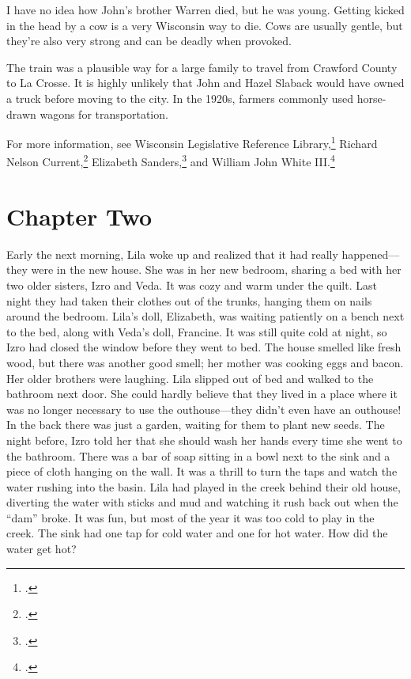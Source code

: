 \documentclass[
  american,
  letterpaper,
]{book}
\begin{document}
I have no idea how John's brother Warren died, but he was young. Getting
kicked in the head by a cow is a very Wisconsin way to die. Cows are
usually gentle, but they're also very strong and can be deadly when
provoked.

The train was a plausible way for a large family to travel from Crawford
County to La Crosse. It is highly unlikely that John and Hazel Slaback
would have owned a truck before moving to the city. In the 1920s,
farmers commonly used horse-drawn wagons for transportation.

For more information, see Wisconsin Legislative Reference
Library,\footnote{.}
Richard Nelson Current,\footnote{.} Elizabeth Sanders,\footnote{.} and William John White
III.\footnote{.}


\chapter{Chapter Two}\label{chapter-two}

Early the next morning, Lila woke up and realized that it had really
happened---they were in the new house. She was in her new bedroom,
sharing a bed with her two older sisters, Izro and Veda. It was cozy and
warm under the quilt. Last night they had taken their clothes out of the
trunks, hanging them on nails around the bedroom. Lila's doll,
Elizabeth, was waiting patiently on a bench next to the bed, along with
Veda's doll, Francine. It was still quite cold at night, so Izro had
closed the window before they went to bed. The house smelled like fresh
wood, but there was another good smell; her mother was cooking eggs and
bacon. Her older brothers were laughing. Lila slipped out of bed and
walked to the bathroom next door. She could hardly believe that they
lived in a place where it was no longer necessary to use the
outhouse---they didn't even have an outhouse! In the back there was just
a garden, waiting for them to plant new seeds. The night before, Izro
told her that she should wash her hands every time she went to the
bathroom. There was a bar of soap sitting in a bowl next to the sink and
a piece of cloth hanging on the wall. It was a thrill to turn the taps
and watch the water rushing into the basin. Lila had played in the creek
behind their old house, diverting the water with sticks and mud and
watching it rush back out when the ``dam'' broke. It was fun, but most
of the year it was too cold to play in the creek. The sink had one tap
for cold water and one for hot water. How did the water get hot?
\end{document}

